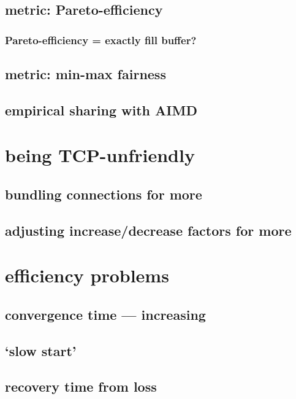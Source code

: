 \subsection{metric: Pareto-efficiency}

\subsubsection{Pareto-efficiency = exactly fill buffer?}

\subsection{metric: min-max fairness}

\subsection{empirical sharing with AIMD}

\section{being TCP-unfriendly}

\subsection{bundling connections for more}

\subsection{adjusting increase/decrease factors for more}

\section{efficiency problems}

\subsection{convergence time --- increasing}

\subsection{`slow start'}

\subsection{recovery time from loss}

